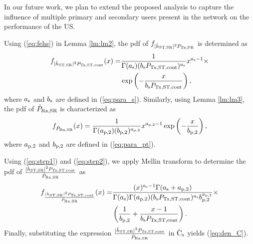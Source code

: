 In our future work, we plan to extend the proposed analysis to capture the influence of multiple primary and secondary users present in the network on the performance of the US.  
 \label{ap:one}
\begin{IEEEproof}
Using (\ref{eq:fehs}) in Lemma \ref{lm:lm2}, the pdf of $f_{|\hat{h}_{\text{ST,SR}}|^2 P_{\text{Tx,PR}}}$ is determined as
\begin{align}
f_{\epgs \preg}(x) =& \frac{1}{\Gamma(\as) (\bs \preg)^{\as}} x^{\as - 1} \times \nonumber \\ & \exp\left( - \frac{x}{ \bs \preg} \right), \label{eq:step1} 
\end{align}
where $a_{\text{s}}$ and $b_{\text{s}}$ are defined in (\ref{eq:para_s}).
Similarly, using Lemma \ref{lm:lm3}, the pdf of $\hat{P}_{\text{Rx,SR}}$ is characterized as
\begin{align}
f_{\eprcvdsr}(x) = \frac{1}{\Gamma(\apt) (\bpt)^{\apt}} x^{\apt - 1} \exp\left( - \frac{x}{ \bpt} \right), \label{eq:step2} 
\end{align}
where $a_{\text{p,2}}$ and $b_{\text{p,2}}$ are defined in (\ref{eq:para_pt}).

Using (\ref{eq:step1}) and (\ref{eq:step2}), we apply Mellin transform \cite{NIST} to determine the pdf of $\frac{|\hat{h}_{\text{ST,SR}}|^2 P_{\text{Tx,ST,cont}}}{\hat{P}_{\text{Rx,SR}}}$ as
\begin{align}
f_{\frac{|\hat{h}_{\text{ST,SR}}|^2 P_{\text{Tx,ST,cont}}}{\hat{P}_{\text{Rx,SR}}}}(x) =& \frac{(x)^{a_{\text{s}} - 1} \Gamma(a_{\text{s}} + a_{\text{p,2}})}{\Gamma(a_{\text{s}}) \Gamma(a_{\text{p,2}}) (b_{\text{s}} P_{\text{Tx,ST,cont}}) ^{a_{\text{s}}} b_{\text{p,2}}^{a_{\text{p,2}}}} \times \nonumber \\ &  \left(\frac{1}{b_{\text{p,2}}} + \frac{x - 1}{b_{\text{s}} P_{\text{Tx,ST,cont}}}\right).
\end{align}
Finally, substituting the expression $\frac{|\hat{h}_{\text{ST,SR}}|^2 P_{\text{Tx,ST,cont}}}{\hat{P}_{\text{Rx,SR}}}$ in $\hat{\text{{C}}}_{\text{s}}$ yields (\ref{eq:den_C}).
\end{IEEEproof}

